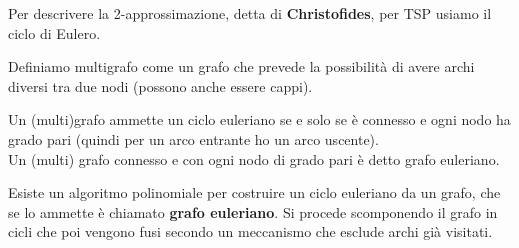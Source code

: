 \documentclass[a4paper,12pt, oneside]{book}
\begin{document}
Per descrivere la 2-approssimazione, detta di \textbf{Christofides}, per TSP
usiamo il ciclo di Eulero.
\begin{definizione}
  Definiamo multigrafo come un grafo che prevede la possibilità di avere archi
  diversi tra due nodi (possono anche essere cappi).
\end{definizione}
\begin{teorema}
  Un (multi)grafo ammette un ciclo euleriano se e solo se è connesso e ogni nodo
  ha grado pari (quindi per un arco entrante ho un arco uscente).\\
  Un (multi) grafo connesso e con ogni nodo di grado pari è detto grafo
  euleriano. 
\end{teorema}
Esiste un algoritmo polinomiale per costruire un ciclo euleriano da un grafo,
che se lo ammette è chiamato \textbf{grafo euleriano}. Si procede scomponendo il
grafo in cicli che poi vengono fusi secondo un meccanismo che esclude archi già
visitati.\\
\end{document}
